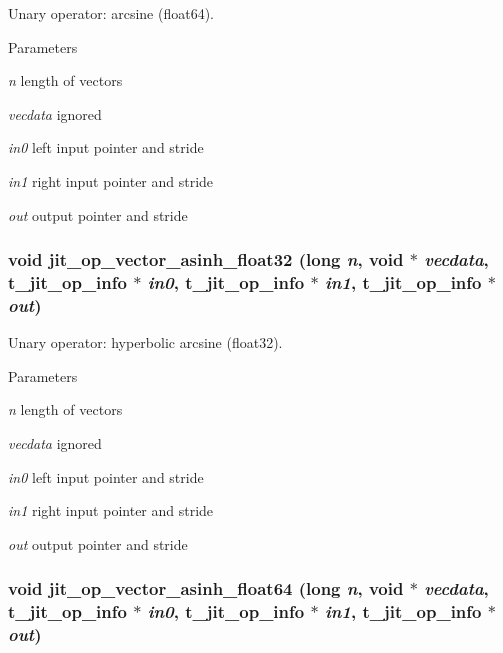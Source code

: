 Unary operator: arcsine (float64). 
\begin{DoxyParams}{Parameters}
\item[{\em n}]length of vectors \item[{\em vecdata}]ignored \item[{\em in0}]left input pointer and stride \item[{\em in1}]right input pointer and stride \item[{\em out}]output pointer and stride \end{DoxyParams}
\hypertarget{group__opvecmod_ga89dcc71ebb58320ca582b2bfb59b1566}{
\subsubsection[{jit\_\-op\_\-vector\_\-asinh\_\-float32}]{\setlength{\rightskip}{0pt plus 5cm}void jit\_\-op\_\-vector\_\-asinh\_\-float32 (long {\em n}, \/  void $\ast$ {\em vecdata}, \/  {\bf t\_\-jit\_\-op\_\-info} $\ast$ {\em in0}, \/  {\bf t\_\-jit\_\-op\_\-info} $\ast$ {\em in1}, \/  {\bf t\_\-jit\_\-op\_\-info} $\ast$ {\em out})}}
\label{group__opvecmod_ga89dcc71ebb58320ca582b2bfb59b1566}


Unary operator: hyperbolic arcsine (float32). 
\begin{DoxyParams}{Parameters}
\item[{\em n}]length of vectors \item[{\em vecdata}]ignored \item[{\em in0}]left input pointer and stride \item[{\em in1}]right input pointer and stride \item[{\em out}]output pointer and stride \end{DoxyParams}
\hypertarget{group__opvecmod_ga8b26e3d9b7e06608165cbadf5238df12}{
\subsubsection[{jit\_\-op\_\-vector\_\-asinh\_\-float64}]{\setlength{\rightskip}{0pt plus 5cm}void jit\_\-op\_\-vector\_\-asinh\_\-float64 (long {\em n}, \/  void $\ast$ {\em vecdata}, \/  {\bf t\_\-jit\_\-op\_\-info} $\ast$ {\em in0}, \/  {\bf t\_\-jit\_\-op\_\-info} $\ast$ {\em in1}, \/  {\bf t\_\-jit\_\-op\_\-info} $\ast$ {\em out})}}
\label{group__opvecmod_ga8b26e3d9b7e06608165cbadf5238df12}


